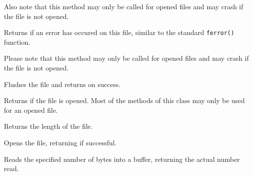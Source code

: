 Also note that this method may only be called for opened files and may crash if
the file is not opened.




\label{wxffileerror}

Returns \true if an error has occured on this file, similar to the standard
\texttt{ferror()} function.

Please note that this method may only be called for opened files and may crash
if the file is not opened.




\label{wxffileflush}


Flushes the file and returns \true on success.


\label{wxffileisopened}


Returns \true if the file is opened. Most of the methods of this class may only
be used for an opened file.


\label{wxffilelength}


Returns the length of the file.


\label{wxffileopen}


Opens the file, returning \true if successful.





\label{wxffileread}


Reads the specified number of bytes into a buffer, returning the actual number read.



